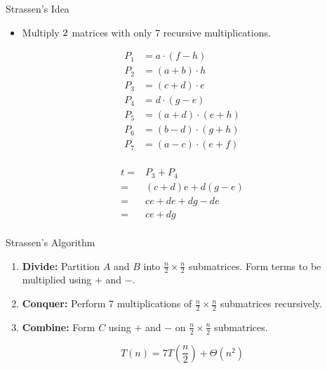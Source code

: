 \documentclass{beamer}
\begin{document}
\begin{frame}{Strassen's Idea}
    \begin{itemize}
        \item Multiply $2 \time 2$ matrices with only 7 recursive multiplications.
    \end{itemize}
    \begin{minipage}{0.48\textwidth}
        \begin{equation*}
            \begin{split}
                P_1 &= a \cdot (f - h) \\
                P_2 &= (a + b) \cdot h \\
                P_3 &= (c + d) \cdot e \\
                P_4 &= d \cdot (g - e) \\
                P_5 &= (a + d) \cdot (e + h) \\
                P_6 &= (b - d) \cdot (g + h) \\
                P_7 &= (a - c) \cdot (e + f) \\
            \end{split}
        \end{equation*}
    \end{minipage} %
    \hfill
    \begin{minipage}{0.48\textwidth}
        \begin{equation*}
            \begin{split}
                t =& P_3 + P_4 \\
                  =& (c + d)e + d(g - e) \\
                  =& ce + de + dg - de \\
                  =& ce + dg \\
            \end{split}
        \end{equation*}
    \end{minipage}
\end{frame}

\begin{frame}{Strassen's Algorithm}
    \begin{enumerate}
        \item \textbf{\Large Divide:} Partition $A$ and $B$ into $\frac{n}{2} \times \frac{n}{2}$ submatrices.  Form terms to be multiplied using $+$ and $-$.
        \item \textbf{\Large Conquer:} Perform $7$ multiplications of $\frac{n}{2} \times \frac{n}{2}$ submatrices recursively.
        \item \textbf{\Large Combine:} Form $C$ using $+$ and $-$ on $\frac{n}{2} \times \frac{n}{2}$ submatrices.
    \end{enumerate} \pause
    $$
        T(n) = 7T\left(\frac{n}{2}\right) + \Theta(n^2)
    $$
\end{frame}
\end{document}
